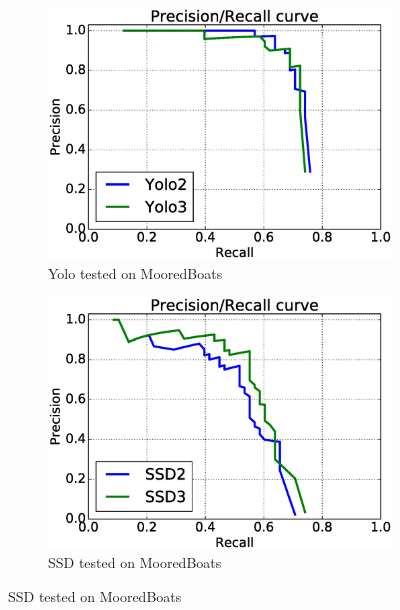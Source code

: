 \begin{figure}[h!]
\captionsetup[subfigure]{justification=centering}
\begin{subfigure}{.5\textwidth}
  \centering
  \includegraphics[width=0.8\linewidth]{results/case_buildings/prec_recall/yolo/bb.eps}
  \caption{Yolo tested on MooredBoats}
  \label{fig:sfig1}
\end{subfigure}%
\begin{subfigure}{.5\textwidth}
  \centering
  \includegraphics[width=.8\linewidth]{results/case_buildings/prec_recall/ssd/bb.eps}
  \caption{SSD tested on MooredBoats}
  \label{fig:sfig2}
\end{subfigure}


\end{figure}
